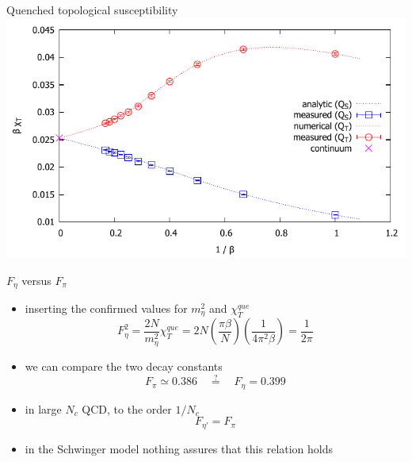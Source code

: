 \documentclass[english]{beamer}
\begin{document}
\begin{frame}{Quenched topological susceptibility}
  \includegraphics[width=1\textwidth]{figs/BeakDiagram}
\end{frame}

\begin{frame}{$F_\eta$ versus $F_\pi$}
  \begin{itemize}
    \item inserting the confirmed values for $m_\eta^2$
      and $\chi_T^{que}$ 
      \[
        F_{\eta}^2 = \frac{2N}{m_\eta^2}\chi_T^{que} =
          2N \left(\frac{\pi\beta}{N}\right)
          \left(\frac{1}{4\pi^2\beta}\right) =
          \frac{1}{2\pi}
      \]
    \item we can compare the two decay constants
      \[
        F_\pi \simeq 0.386 \quad \overset{?}{=} \quad F_{\eta} = 0.399
      \]
    \item in large $N_c$ QCD, to the order $1/N_c$
      \[
        F_{\eta'} = F_\pi
      \]
    \item in the Schwinger model nothing assures that this relation 
      holds  
  \end{itemize}
\end{frame}
\end{document}
